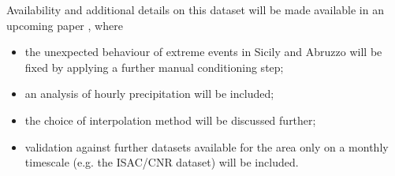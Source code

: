 Availability and additional details on this dataset will be made available in an upcoming paper \citep[][in preparation]{Fantini2019a}, where
\begin{itemize}
    \item the unexpected behaviour of extreme events in Sicily and Abruzzo will be fixed by applying a further manual conditioning step;
    \item an analysis of hourly precipitation will be included;
    \item the choice of interpolation method will be discussed further;
    \item validation against further datasets available for the area only on a monthly timescale (e.g. the ISAC/CNR dataset) will be included.
\end{itemize}

